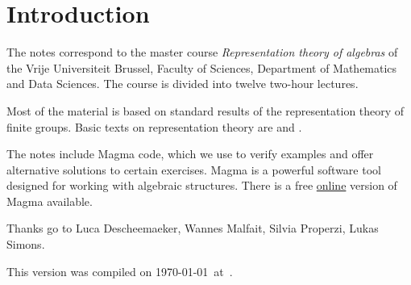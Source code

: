\thispagestyle{plain}
\section*{Introduction}

The notes correspond to the master  
course \emph{Representation theory of algebras} of the 
Vrije Universiteit Brussel, 
Faculty of Sciences, 
Department of Mathematics and Data Sciences. The course
is divided into twelve two-hour lectures. 

Most of the material is based on standard 
results of the representation theory of finite groups. 
Basic texts on representation theory are \cite{MR1369573} 
and \cite{MR2270898}. 

The notes include Magma code, which we use to verify examples and offer alternative solutions to certain exercises. Magma \cite{zbMATH01077111} is a powerful software tool designed for working with algebraic structures. There is a free \href{https://magma.maths.usyd.edu.au/calc/}{online} version of Magma available.


Thanks go to Luca Descheemaeker, Wannes Malfait, Silvia Properzi, Lukas Simons.  



This version 
was compiled on \today~at~\currenttime.
